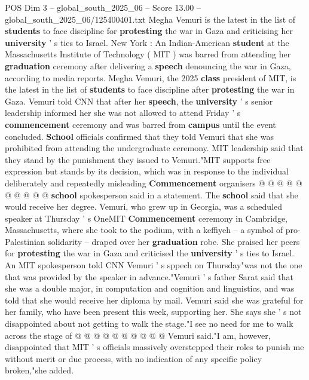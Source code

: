 \begin{textsample}{POS Dim 3 – global\_south\_2025\_06 – Score 13.00 – global\_south\_2025\_06/125400401.txt}  \label{ex:f3_pos_206}
Megha Vemuri is the latest in the list of \textbf{students} to face discipline for \textbf{protesting} the war in Gaza and criticising her \textbf{university} ' s ties to Israel.
New York : An Indian-American \textbf{student} at the Massachusetts Institute of Technology ( MIT ) was barred from attending her \textbf{graduation} ceremony after delivering a \textbf{speech} denouncing the war in Gaza, according to media reports.
Megha Vemuri, the 2025 \textbf{class} president of MIT, is the latest in the list of \textbf{students} to face discipline after \textbf{protesting} the war in Gaza.
Vemuri told CNN that after her \textbf{speech}, the \textbf{university} ' s senior leadership informed her she was not allowed to attend Friday ' s \textbf{commencement} ceremony and was barred from \textbf{campus} until the event concluded. \textbf{School} officials confirmed that they told Vemuri that she was prohibited from attending the undergraduate ceremony.
MIT leadership said that they stand by the punishment they issued to Vemuri."MIT supports free expression but stands by its decision, which was in response to the individual deliberately and repeatedly misleading \textbf{Commencement} organisers @ @ @ @ @ @ @ @ @ @ \textbf{school} spokesperson said in a statement.
The \textbf{school} said that she would receive her degree.
Vemuri, who grew up in Georgia, was a scheduled speaker at Thursday ' s OneMIT \textbf{Commencement} ceremony in Cambridge, Massachusetts, where she took to the podium, with a keffiyeh -- a symbol of pro-Palestinian solidarity -- draped over her \textbf{graduation} robe.
She praised her peers for \textbf{protesting} the war in Gaza and criticised the \textbf{university} ' s ties to Israel.
An MIT spokesperson told CNN Vemuri ' s sppech on Thursday"was not the one that was provided by the speaker in advance."Vemuri ' s father Sarat said that she was a double major, in computation and cognition and linguistics, and was told that she would receive her diploma by mail.
Vemuri said she was grateful for her family, who have been present this week, supporting her.
She says she ' s not disappointed about not getting to walk the stage."I see no need for me to walk across the stage of @ @ @ @ @ @ @ @ @ @ Vemuri said."I am, however, disappointed that MIT ' s officials massively overstepped their roles to punish me without merit or due process, with no indication of any specific policy broken,"she added.

\end{textsample}
